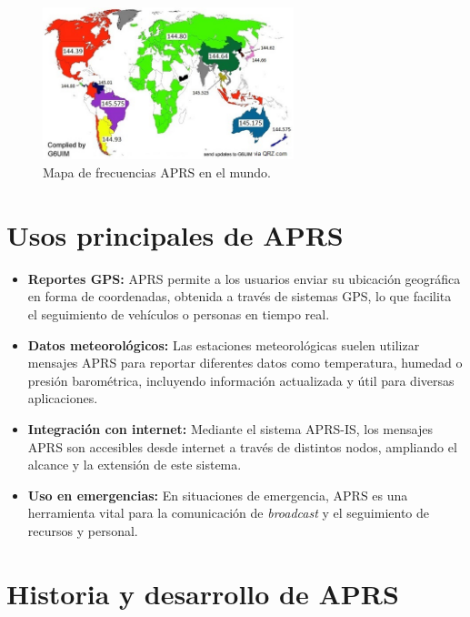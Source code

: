 \begin{figure}[h]
	\centering
	\includegraphics[width=0.65\textwidth]{Imagenes/Chapter_1/mapa_frecuencias_aprs.jpg}
	\caption{Mapa de frecuencias APRS en el mundo.}
	\label{fig:freq-map-es}
\end{figure}


\section{Usos principales de APRS}

\begin{itemize}
	\item \textbf{Reportes GPS:} APRS permite a los usuarios enviar su ubicación geográfica en forma de coordenadas, obtenida a través de sistemas GPS, lo que facilita el seguimiento de vehículos o personas en tiempo real.

	\item \textbf{Datos meteorológicos:} Las estaciones meteorológicas suelen utilizar mensajes APRS para reportar diferentes datos como temperatura, humedad o presión barométrica, incluyendo información actualizada y útil para diversas aplicaciones.

	\item \textbf{Integración con internet:} Mediante el sistema APRS-IS, los mensajes APRS son accesibles desde internet a través de distintos nodos, ampliando el alcance y la extensión de este sistema.

	\item \textbf{Uso en emergencias:} En situaciones de emergencia, APRS es una herramienta vital para la comunicación de \textit{broadcast} y el seguimiento de recursos y personal.
\end{itemize}

\section{Historia y desarrollo de APRS}

